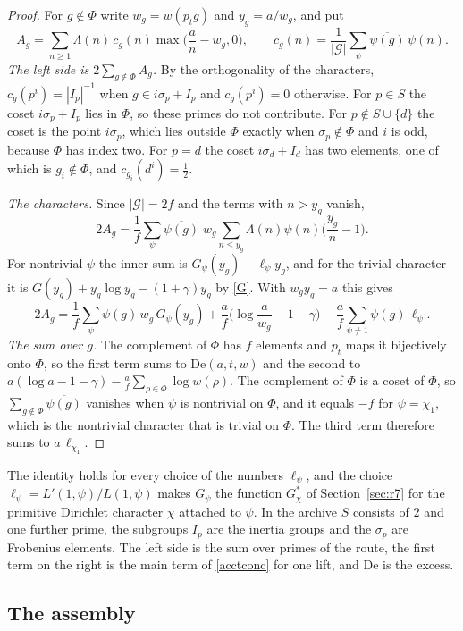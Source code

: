 \documentclass[11pt,letterpaper]{article}
\numberwithin{equation}{section}
\begin{document}
\begin{proof}
For $g\notin\Phi$ write $w_g=w(p_tg)$ and $y_g=a/w_g$, and put
\[
A_g=\sum_{n\ge1}\Lambda(n)\,c_g(n)\max\Big(\frac an-w_g,0\Big),\qquad c_g(n)=\frac1{|\mathcal G|}\sum_\psi\overline{\psi(g)}\,\psi(n).
\]
\emph{The left side is $2\sum_{g\notin\Phi}A_g$.} By the orthogonality of the characters, $c_g(p^i)=|I_p|^{-1}$ when $g\in i\sigma_p+I_p$ and $c_g(p^i)=0$ otherwise. For $p\in S$ the coset $i\sigma_p+I_p$ lies in $\Phi$, so these primes do not contribute. For $p\notin S\cup\{d\}$ the coset is the point $i\sigma_p$, which lies outside $\Phi$ exactly when $\sigma_p\notin\Phi$ and $i$ is odd, because $\Phi$ has index two. For $p=d$ the coset $i\sigma_d+I_d$ has two elements, one of which is $g_i\notin\Phi$, and $c_{g_i}(d^i)=\tfrac12$.

\emph{The characters.} Since $|\mathcal G|=2f$ and the terms with $n>y_g$ vanish,
\[
2A_g=\frac1f\sum_\psi\overline{\psi(g)}\;w_g\sum_{n\le y_g}\Lambda(n)\psi(n)\Big(\frac{y_g}n-1\Big).
\]
For nontrivial $\psi$ the inner sum is $G_\psi(y_g)-\ell_\psi y_g$, and for the trivial character it is $G(y_g)+y_g\log y_g-(1+\gamma)y_g$ by \eqref{G}. With $w_gy_g=a$ this gives
\[
2A_g=\frac1f\sum_\psi\overline{\psi(g)}\,w_g\,G_\psi(y_g)+\frac af\Big(\log\frac a{w_g}-1-\gamma\Big)-\frac af\sum_{\psi\ne1}\overline{\psi(g)}\,\ell_\psi .
\]
\emph{The sum over $g$.} The complement of $\Phi$ has $f$ elements and $p_t$ maps it bijectively onto $\Phi$, so the first term sums to $\mathrm{De}(a,t,w)$ and the second to $a(\log a-1-\gamma)-\frac af\sum_{\rho\in\Phi}\log w(\rho)$. The complement of $\Phi$ is a coset of $\Phi$, so $\sum_{g\notin\Phi}\overline{\psi(g)}$ vanishes when $\psi$ is nontrivial on $\Phi$, and it equals $-f$ for $\psi=\chi_1$, which is the nontrivial character that is trivial on $\Phi$. The third term therefore sums to $a\,\ell_{\chi_1}$.
\end{proof}

The identity holds for every choice of the numbers $\ell_\psi$, and the choice $\ell_\psi=L'(1,\psi)/L(1,\psi)$ makes $G_\psi$ the function $G^\ast_\chi$ of Section~\ref{sec:r7} for the primitive Dirichlet character $\chi$ attached to $\psi$. In the archive $S$ consists of $2$ and one further prime, the subgroups $I_p$ are the inertia groups and the $\sigma_p$ are Frobenius elements. The left side is the sum over primes of the route, the first term on the right is the main term of \eqref{acctconc} for one lift, and $\mathrm{De}$ is the excess.

\subsection{The assembly}\label{sec:assembly}
\end{document}
